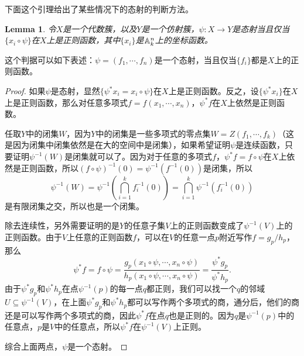 \documentclass[9pt]{extarticle}
\theoremstyle{plain}%
\newtheorem{lem}[defi]{Lemma}%
\begin{document}
下面这个引理给出了某些情况下的态射的判断方法。
\begin{lem}
	令$X$是一个代数簇，以及$Y$是一个仿射簇，$\psi:X\to Y$是态射当且仅当$\{x_i\circ \psi\}$在$X$上是正则函数，其中$\{x_i\}$是$\mathbb{A}^n_k$上的坐标函数。
	\label{c3:l1}
\end{lem}
这个判据可以如下表述：$\psi=(f_1,\cdots,f_n)$是一个态射，当且仅当$\{f_i\}$都是$X$上的正则函数。
\begin{proof}
	如果$\psi$是态射，显然$\{\psi^*x_i=x_i\circ \psi\}$在$X$上是正则函数。反之，设$\{\psi^*x_i\}$在$X$上是正则函数，那么对任意多项式$f=f(x_1,\cdots,x_n)$，$\psi^*f$在$X$上依然是正则函数。

	任取$Y$中的闭集$W$，因为$Y$中的闭集是一些多项式的零点集$W=Z(f_1,\cdots,f_k)$（这是因为闭集中闭集依然是在大的空间中是闭集），如果希望证明$\psi$是连续函数，只要证明$\psi^{-1}(W)$是闭集就可以了。因为对于任意的多项式$f$，$\psi^*f=f\circ \psi$在$X$上依然是正则函数，所以$(f\circ \psi)^{-1}(0)=\psi^{-1}(f^{-1}(0))$是闭集，所以
	\[
		\psi^{-1}(W)=\psi^{-1}\left(\bigcap_{i=1}^k f_i^{-1}(0)\right)=\bigcap_{i=1}^k\psi^{-1}\left( f_i^{-1}(0)\right)
	\]
	是有限闭集之交，所以也是一个闭集。

	除去连续性，另外需要证明的是$Y$的任意子集$V$上的正则函数变成了$\psi^{-1}(V)$上的正则函数。由于$V$上任意的正则函数$f$，可以在$V$的任意一点$p$附近写作$f=g_p/h_p$，那么
	\[
		\psi^*f=f\circ \psi=\frac{g_p(x_1\circ \psi,\cdots,x_n\circ \psi)}{h_p(x_1\circ \psi,\cdots,x_n\circ \psi)}=\frac{\psi^*g_p}{\psi^*h_p}.
	\]
	由于$\psi^*g_p$和$\psi^*h_p$在点$\psi^{-1}(p)$的每一点$q$都正则，我们可以找一个$q$的邻域$U\subseteq \psi^{-1}(V)$，在上面$\psi^*g_p$和$\psi^*h_p$都可以写作两个多项式的商，通分后，他们的商还是可以写作两个多项式的商，因此$\psi^*f$在点$q$也是正则的。因为$q$是$\psi^{-1}(p)$中的任意点，$p$是$V$中的任意点，所以$\psi^*f$在$\psi^{-1}(V)$上正则。

	综合上面两点，$\psi$是一个态射。
\end{proof}
\end{document}
